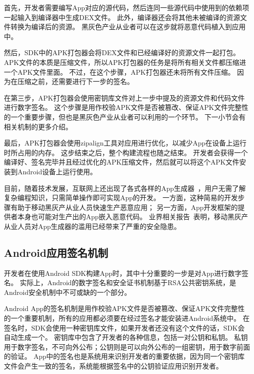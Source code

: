 首先，开发者需要编写App对应的源代码，然后连同一些源代码中使用到的依赖项一起输入到编译器中生成DEX文件。
此外，编译器还会将其他未被编译的资源文件转换为编译后的资源。
黑灰色产业从业者可以在这步就将恶意代码植入到应用中。

然后，SDK中的APK打包器会将DEX文件和已经编译好的资源文件一起打包。
APK文件的本质是压缩文件，所以APK打包器的任务是将所有相关文件都压缩进一个APK文件里面。
不过，在这个步骤，APK打包器还未将所有文件压缩。
因为在压缩之前，还需要进行下一步的签名。

在第三步，APK打包器会使用密钥库文件对上一步中提及的资源文件和代码文件进行数字签名。
这个步骤是用作校验APK文件是否被篡改、保证APK文件完整性的一个重要步骤，但也是黑灰色产业从业者可以利用的一个环节。
下一小节会有相关机制的更多介绍。

最后，APK打包器会使用zipalign工具对应用进行优化，以减少App在设备上运行时所占用的内存。
这步结束之后，整个构建流程也随之结束。
开发者会获得一个编译好、签名完毕并且经过优化的APK压缩文件，然后就可以将这个APK文件安装到Android设备上运行使用。

目前，随着技术发展，互联网上还出现了各式各样的App生成器~\cite{anjian, iApp}，用户无需了解复杂编程知识，只需简单操作即可实现App的开发。
一方面，这种简易的开发步骤有助于移动黑灰产从业人员快速生产恶意应用；
另一方面，App开发框架的提供者本身也可能对生产出的App嵌入恶意代码。
业界相关报告~\cite{anquanke_framework}表明，移动黑灰产从业人员对App生成器的滥用已经带来了严重的安全隐患。

\subsection{Android应用签名机制}

开发者在使用Android SDK构建App时，其中十分重要的一步是对App进行数字签名。
实际上，Android的数字签名和安全证书机制基于RSA公共密钥系统，是Android安全机制中不可或缺的一个部分。

Android App的签名机制是用作校验APK文件是否被篡改、保证APK文件完整性的一个重要机制，所有的应用都必须要在经过签名才能安装进Android系统中。
在签名时，SDK会使用一种密钥库文件，如果开发者还没有这个文件的话，SDK会自动生成一个。
密钥库中包含了开发者的各种信息，包括一对公钥和私钥。
私钥用于数字签名，不可向外公布；公钥则是可以向外公布的一组密钥，用于数字前面的验证。
App中的签名也是系统用来识别开发者的重要依据，因为同一个密钥库文件会产生一致的签名，系统能根据签名中的公钥验证应用识别开发者。

